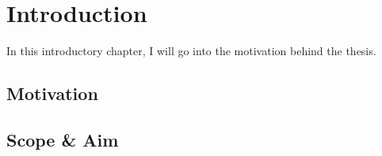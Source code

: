 \chapter{Introduction}
In this introductory chapter, I will go into the motivation behind the thesis.

\section{Motivation}
\section{Scope \& Aim}